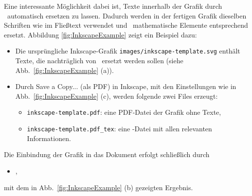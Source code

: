 Eine interessante Möglichkeit dabei ist, Texte innerhalb der Grafik
durch \latex\ automatisch ersetzen zu lassen.
Dadurch werden in der fertigen Grafik dieselben Schriften wie im Fließtext
verwendet und \va\ mathematische Elemente entsprechend ersetzt.
Abbildung \ref{fig:InkscapeExample} zeigt ein Beispiel dazu:
%
\begin{itemize}
\item
Die ursprüngliche Inkscape-Grafik \nolinkurl{images/inkscape-template.svg}  enthält
Texte, die nachträglich von \latex\ ersetzt werden sollen (siehe Abb.~\ref{fig:InkscapeExample} (a)).
\item
Durch \textsf{Save a Copy...} (als PDF) in Inkscape, mit den Einstellungen wie in 
Abb.~\ref{fig:InkscapeExample} (c), werden folgende zwei Files erzeugt:
\begin{itemize}
\item[] \nolinkurl{inkscape-template.pdf}: eine PDF-Datei der Grafik ohne Texte, 
\item[] \nolinkurl{inkscape-template.pdf_tex}: eine \latex-Datei mit allen relevanten Informationen.
\end{itemize}
\end{itemize}
%
Die Einbindung der Grafik in das Dokument erfolgt schließlich durch
\begin{itemize}
\item[] \verb!!,
\end{itemize}
mit dem in Abb.~\ref{fig:InkscapeExample} (b) gezeigten Ergebnis.



